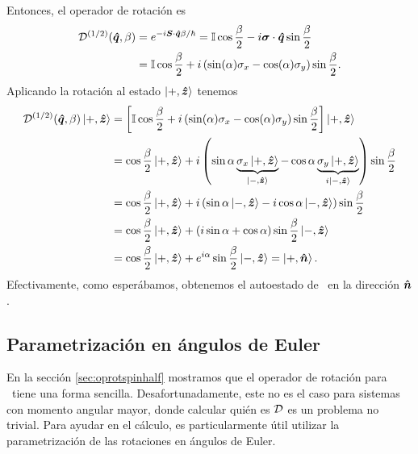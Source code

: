 \documentclass[10pt, a4paper]{article}
\numberwithin{equation}{subsection}
\begin{document}
Entonces, el operador de rotación es
\begin{align}
  \RotationOp[1/2](\vers{q},\beta) &= e^{-i\vect{S}\cdot\vers{q}\beta/\hbar}
    = \Id\cos\frac{\beta}{2} -i\vect\sigma\cdot\vers{q}\sin\frac{\beta}{2} \\
  &= \Id\cos\frac{\beta}{2} + i\left(\sin(\alpha)\sigma_x -
    \cos(\alpha)\sigma_y\right) \sin\frac{\beta}{2}.
\end{align}
Aplicando la rotación al estado $\ket{+,\vu*{z}}$ tenemos
\begin{align}
  \RotationOp[1/2](\vers{q},\beta) \ket{+,\vers{z}}
    &= \left[\Id\cos\frac{\beta}{2} + i\left(\sin(\alpha)\sigma_x -
    \cos(\alpha)\sigma_y\right) \sin\frac{\beta}{2}\right]\ket{+,\vers{z}}
    \nonumber \\
  &= \cos\frac{\beta}{2}\ket{+,\vers{z}} + i\left(\sin\alpha
    \underbrace{\sigma_x\ket{+,\vers{z}}}_{\ket{-,\vers{z}}} - \cos\alpha
    \underbrace{\sigma_y\ket{+,\vers{z}}}_{i\ket{-,\vers{z}}}\right)
    \sin\frac{\beta}{2} \nonumber \\
  &= \cos\frac{\beta}{2}\ket{+,\vers{z}} + i\left(\sin\alpha
    \ket{-,\vers{z}} - i\cos\alpha \ket{-,\vers{z}}\right)
    \sin\frac{\beta}{2} \nonumber \\
  &= \cos\frac{\beta}{2}\ket{+,\vers{z}} + \left(i\sin\alpha
    + \cos\alpha\right) \sin\frac{\beta}{2} \ket{-,\vers{z}} \nonumber \\
  &= \cos\frac{\beta}{2}\ket{+,\vers{z}} +
    e^{i\alpha}\sin\frac{\beta}{2}\ket{-,\vers{z}} = \ket{+,\vers{n}}.
  \label{eq:res:ketnrot}
\end{align}
Efectivamente, como esperábamos, obtenemos el autoestado de \spin~en la
dirección $\vu*{n}$.

\subsection{Parametrización en ángulos de Euler}

En la sección \ref{sec:oprotspinhalf} mostramos que el operador de rotación
para \spinhalf~tiene una forma sencilla. Desafortunadamente, este no es el caso
para sistemas con momento angular mayor, donde calcular quién es $\RotationOp$
es un problema no trivial. Para ayudar en el cálculo, es particularmente útil
utilizar la parametrización de las rotaciones en ángulos de Euler.
\end{document}
